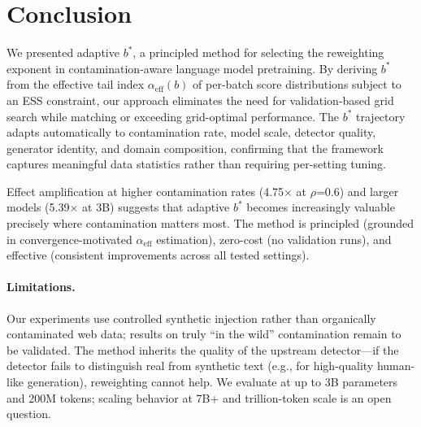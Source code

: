 \documentclass[11pt]{article}
\begin{document}
\section{Conclusion}
\label{sec:conclusion}

We presented adaptive $b^*$, a principled method for selecting the reweighting exponent in contamination-aware language model pretraining. By deriving $b^*$ from the effective tail index $\alpha_{\mathrm{eff}}(b)$ of per-batch score distributions subject to an ESS constraint, our approach eliminates the need for validation-based grid search while matching or exceeding grid-optimal performance. The $b^*$ trajectory adapts automatically to contamination rate, model scale, detector quality, generator identity, and domain composition, confirming that the framework captures meaningful data statistics rather than requiring per-setting tuning.

Effect amplification at higher contamination rates (4.75$\times$ at $\rho$=0.6) and larger models (5.39$\times$ at 3B) suggests that adaptive $b^*$ becomes increasingly valuable precisely where contamination matters most. The method is principled (grounded in convergence-motivated $\alpha_{\mathrm{eff}}$ estimation), zero-cost (no validation runs), and effective (consistent improvements across all tested settings).

\paragraph{Limitations.}
Our experiments use controlled synthetic injection rather than organically contaminated web data; results on truly ``in the wild'' contamination remain to be validated. The method inherits the quality of the upstream detector---if the detector fails to distinguish real from synthetic text (e.g., for high-quality human-like generation), reweighting cannot help. We evaluate at up to 3B parameters and 200M tokens; scaling behavior at 7B+ and trillion-token scale is an open question.


\end{document}
